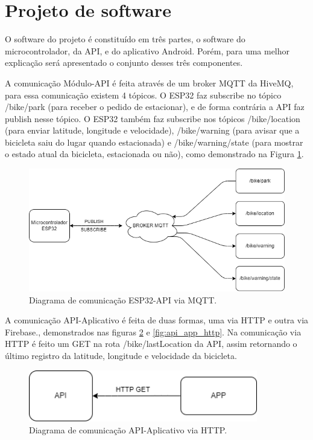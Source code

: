 \newpage
\section{Projeto de software}

O software do projeto é constituído em três partes, o software do microcontrolador, da API, e do aplicativo Android. Porém, para uma melhor explicação será apresentado o conjunto desses três componentes.

A comunicação Módulo-API é feita através de um broker MQTT da HiveMQ, para essa comunicação existem 4 tópicos. O ESP32 faz subscribe no tópico /bike/park (para receber o pedido de estacionar), e de forma contrária a API faz publish nesse tópico. O ESP32 também faz subscribe nos tópicos /bike/location (para enviar latitude, longitude e velocidade), /bike/warning (para avisar que a bicicleta saiu do lugar quando estacionada) e /bike/warning/state (para mostrar o estado atual da bicicleta, estacionada ou não), como demonstrado na Figura \ref{fig:mqtt_api_modulo}.

\begin{figure}[!h]
\centering
\includegraphics[width=15cm]{capitulos/Figuras/api-modulo.png}
\caption{Diagrama de comunicação ESP32-API via MQTT.}
\label{fig:mqtt_api_modulo}
\end{figure}

\newpage

A comunicação API-Aplicativo é feita de duas formas, uma via HTTP e outra via Firebase., demonstrados nas figuras \ref{fig:api_app_firebase} e \ref{fig:api_app_http}. Na comunicação via HTTP é feito um GET na rota /bike/lastLocation da API, assim retornando o último registro da latitude, longitude e velocidade da bicicleta.

\begin{figure}[!h]
\centering
\includegraphics[width=10cm]{capitulos/Figuras/api-app.png}
\caption{Diagrama de comunicação API-Aplicativo via HTTP.}
\label{fig:api_app_firebase}
\end{figure}

